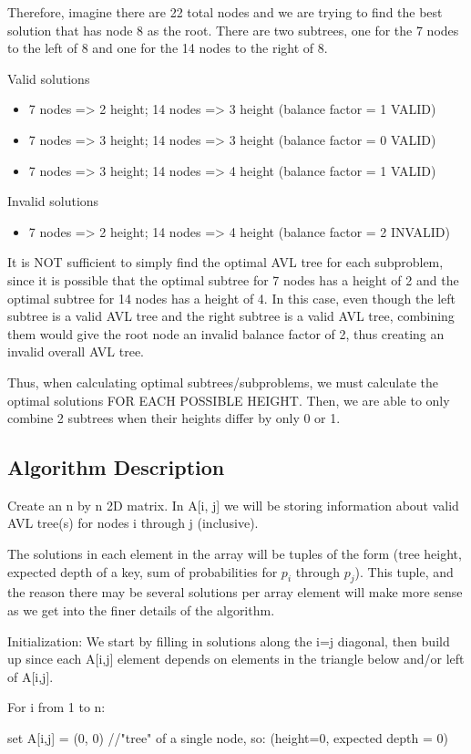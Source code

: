 \documentclass[a4paper]{article}
\begin{document}
Therefore, imagine there are 22 total nodes and we are trying to find the best solution that has node 8 as the root. There are two subtrees, one for the 7 nodes to the left of 8 and one for the 14 nodes to the right of 8.

Valid solutions
\begin{itemize}
    \item 7 nodes => 2 height; 14 nodes => 3 height (balance factor = 1 VALID)
    \item 7 nodes => 3 height; 14 nodes => 3 height (balance factor = 0 VALID)
    \item 7 nodes => 3 height; 14 nodes => 4 height (balance factor = 1 VALID)
\end{itemize}

Invalid solutions
\begin{itemize}
    \item 7 nodes => 2 height; 14 nodes => 4 height (balance factor = 2 INVALID)
\end{itemize}
It is NOT sufficient to simply find the optimal AVL tree for each subproblem, since it is possible that the optimal subtree for 7 nodes has a height of 2 and the optimal subtree for 14 nodes has a height of 4. In this case, even though the left subtree is a valid AVL tree and the right subtree is a valid AVL tree, combining them would give the root node an invalid balance factor of 2, thus creating an invalid overall AVL tree.

Thus, when calculating optimal subtrees/subproblems, we must calculate the optimal solutions FOR EACH POSSIBLE HEIGHT. Then, we are able to only combine 2 subtrees when their heights differ by only 0 or 1.

\subsection{Algorithm Description}

Create an n by n 2D matrix. In A[i, j] we will be storing information about valid AVL tree(s) for nodes i through j (inclusive).

The solutions in each element in the array will be tuples of the form 
(tree height, expected depth of a key, sum of probabilities for $p_i$ through $p_j$).
This tuple, and the reason there may be several solutions per array element will make more sense as we get into the finer details of the algorithm.


Initialization:
We start by filling in solutions along the i=j diagonal, then build up since each A[i,j] element depends on elements in the triangle below and/or left of A[i,j].
\begin{myEnumerate}
\item For i from 1 to n:
    \begin{myEnumerate}
    \item set A[i,j] = (0, 0) //"tree" of a single node, so: (height=0, expected depth = 0)
    \end{myEnumerate}
\end{myEnumerate}
\end{document}
